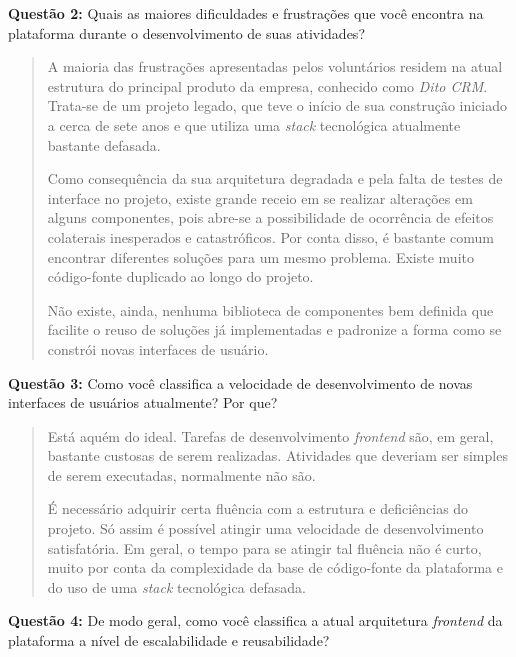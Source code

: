 \textbf{Questão 2:} Quais as maiores dificuldades e frustrações que você encontra na plataforma durante o desenvolvimento de suas atividades?

\begin{quote}
    A maioria das frustrações apresentadas pelos voluntários residem na atual estrutura do principal produto da empresa, conhecido como \textit{Dito CRM}. Trata-se de um projeto legado, que teve o início de sua construção iniciado a cerca de sete anos e que utiliza uma \textit{stack} tecnológica atualmente bastante defasada.
    
    Como consequência da sua arquitetura degradada e pela falta de testes de interface no projeto, existe grande receio em se realizar alterações em alguns componentes, pois abre-se a possibilidade de ocorrência de efeitos colaterais inesperados e catastróficos. Por conta disso, é bastante comum encontrar diferentes soluções para um mesmo problema. Existe muito código-fonte duplicado ao longo do projeto.
    
    Não existe, ainda, nenhuma biblioteca de componentes bem definida que facilite o reuso de soluções já implementadas e padronize a forma como se constrói novas interfaces de usuário.
\end{quote}

\textbf{Questão 3:} Como você classifica a velocidade de desenvolvimento de novas interfaces de usuários atualmente? Por que?

\begin{quote}
    Está aquém do ideal. Tarefas de desenvolvimento \textit{frontend} são, em geral, bastante custosas de serem realizadas. Atividades que deveriam ser simples de serem executadas, normalmente não são.
    
    É necessário adquirir certa fluência com a estrutura e deficiências do projeto. Só assim é possível atingir uma velocidade de desenvolvimento satisfatória. Em geral, o tempo para se atingir tal fluência não é curto, muito por conta da complexidade da base de código-fonte da plataforma e do uso de uma \textit{stack} tecnológica defasada.
\end{quote}

\textbf{Questão 4:} De modo geral, como você classifica a atual arquitetura \textit{frontend} da plataforma a nível de escalabilidade e reusabilidade?

